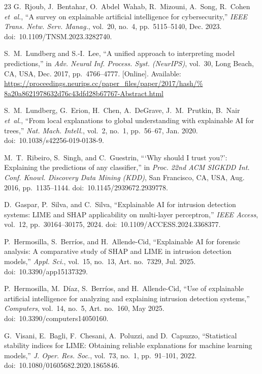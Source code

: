 \documentclass[conference,a4paper]{IEEEtran}
\begin{document}
\begin{thebibliography}{23}
G.~Rjoub, J.~Bentahar, O.~Abdel~Wahab, R.~Mizouni, A.~Song,
R.~Cohen \emph{et~al.},
``A survey on explainable artificial intelligence for cybersecurity,''
\emph{IEEE Trans. Netw. Serv. Manag.}, vol.~20, no.~4,
pp.~5115--5140, Dec. 2023.
doi:~10.1109/TNSM.2023.3282740.

S.~M.~Lundberg and S.-I.~Lee,
``A unified approach to interpreting model predictions,''
in \emph{Adv. Neural Inf. Process. Syst. (NeurIPS)}, vol.~30,
Long Beach, CA, USA, Dec. 2017, pp.~4766--4777. [Online]. Available:
\url{https://proceedings.neurips.cc/paper_files/paper/2017/hash/%
8a20a8621978632d76c43dfd28b67767-Abstract.html}

S.~M.~Lundberg, G.~Erion, H.~Chen, A.~DeGrave, J.~M.~Prutkin,
B.~Nair \emph{et~al.},
``From local explanations to global understanding with explainable AI
for trees,''
\emph{Nat. Mach. Intell.}, vol.~2, no.~1, pp.~56--67, Jan. 2020.
doi:~10.1038/s42256-019-0138-9.

M.~T.~Ribeiro, S.~Singh, and C.~Guestrin,
```Why should I trust you?': Explaining the predictions of any
classifier,''
in \emph{Proc. 22nd ACM SIGKDD Int. Conf. Knowl. Discovery Data Mining
(KDD)}, San Francisco, CA, USA, Aug. 2016, pp.~1135--1144.
doi:~10.1145/2939672.2939778.

D.~Gaspar, P.~Silva, and C.~Silva,
``Explainable AI for intrusion detection systems: LIME and SHAP
applicability on multi-layer perceptron,''
\emph{IEEE Access}, vol.~12, pp.~30164--30175, 2024.
doi:~10.1109/ACCESS.2024.3368377.

P.~Hermosilla, S.~Berr\'ios, and H.~Allende-Cid,
``Explainable AI for forensic analysis: A comparative study of SHAP and
LIME in intrusion detection models,''
\emph{Appl. Sci.}, vol.~15, no.~13, Art. no.~7329, Jul. 2025.
doi:~10.3390/app15137329.

P.~Hermosilla, M.~D\'iaz, S.~Berr\'ios, and H.~Allende-Cid,
``Use of explainable artificial intelligence for analyzing and explaining
intrusion detection systems,''
\emph{Computers}, vol.~14, no.~5, Art. no.~160, May 2025.
doi:~10.3390/computers14050160.

G.~Visani, E.~Bagli, F.~Chesani, A.~Poluzzi, and D.~Capuzzo,
``Statistical stability indices for LIME: Obtaining reliable explanations
for machine learning models,''
\emph{J. Oper. Res. Soc.}, vol.~73, no.~1, pp.~91--101, 2022.
doi:~10.1080/01605682.2020.1865846.


\end{thebibliography}
\end{document}
